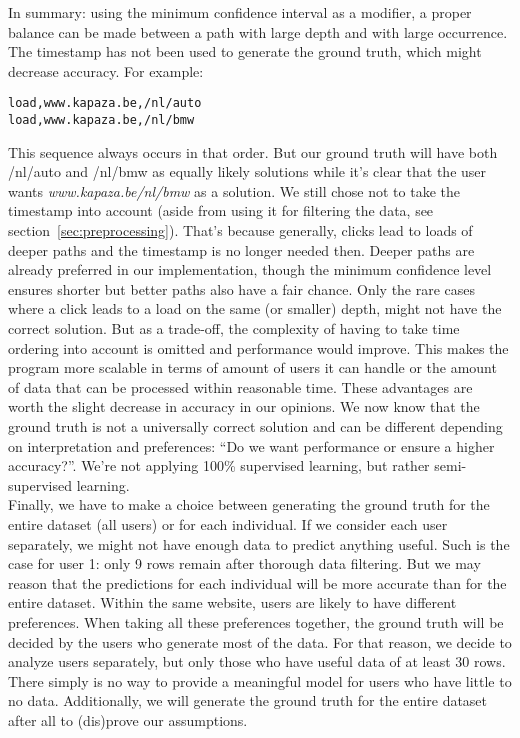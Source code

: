 In summary: using the minimum confidence interval as a modifier, a proper balance can be made between a path with large depth and with large occurrence. 
\\[2ex]
The timestamp has not been used to generate the ground truth, which might decrease accuracy. For example:
\begin{lstlisting}
load,www.kapaza.be,/nl/auto
load,www.kapaza.be,/nl/bmw
\end{lstlisting}
This sequence always occurs in that order. But our ground truth will have both /nl/auto and /nl/bmw as equally likely solutions while it's clear that the user wants \textit{www.kapaza.be/nl/bmw} as a solution. We still chose not to take the timestamp into account (aside from using it for filtering the data, see section~\ref{sec:preprocessing}). That's because generally, clicks lead to loads of deeper paths and the timestamp is no longer needed then. Deeper paths are already preferred in our implementation, though the minimum confidence level ensures shorter but better paths also have a fair chance. Only the rare cases where a click leads to a load on the same (or smaller) depth, might not have the correct solution. But as a trade-off, the complexity of having to take time ordering into account is omitted and performance would improve. This makes the program more scalable in terms of amount of users it can handle or the amount of data that can be processed within reasonable time. These advantages are worth the slight decrease in accuracy in our opinions. We now know that the ground truth is not a universally correct solution and can be different depending on interpretation and preferences: ``Do we want performance or ensure a higher accuracy?''. We're not applying 100\% supervised learning, but rather semi-supervised learning.
\\[2ex]
Finally, we have to make a choice between generating the ground truth for the entire dataset (all users) or for each individual. If we consider each user separately, we might not have enough data to predict anything useful. Such is the case for user 1: only 9 rows remain after thorough data filtering. But we may reason that the predictions for each individual will be more accurate than for the entire dataset. Within the same website, users are likely to have different preferences. When taking all these preferences together, the ground truth will be decided by the users who generate most of the data. For that reason, we decide to analyze users separately, but only those who have useful data of at least 30 rows. There simply is no way to provide a meaningful model for users who have little to no data. Additionally, we will generate the ground truth for the entire dataset after all to (dis)prove our assumptions.


